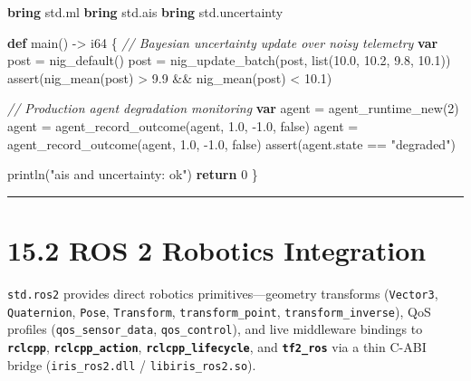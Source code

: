 \documentclass[
  english,
  oneside]{book}
\newenvironment{Shaded}{\begin{snugshade}}{\end{snugshade}}
\newcommand{\CommentTok}[1]{\textcolor[rgb]{0.42,0.60,0.33}{\textit{#1}}}
\newcommand{\ConstantTok}[1]{\textcolor[rgb]{0.31,0.76,1.00}{#1}}
\newcommand{\ControlFlowTok}[1]{\textcolor[rgb]{0.77,0.53,0.75}{\textbf{#1}}}
\newcommand{\DataTypeTok}[1]{\textcolor[rgb]{0.31,0.79,0.69}{#1}}
\newcommand{\DecValTok}[1]{\textcolor[rgb]{0.71,0.81,0.66}{#1}}
\newcommand{\FloatTok}[1]{\textcolor[rgb]{0.71,0.81,0.66}{#1}}
\newcommand{\FunctionTok}[1]{\textcolor[rgb]{0.86,0.86,0.67}{#1}}
\newcommand{\KeywordTok}[1]{\textcolor[rgb]{0.34,0.61,0.84}{\textbf{#1}}}
\newcommand{\NormalTok}[1]{\textcolor[rgb]{0.83,0.83,0.83}{#1}}
\newcommand{\OperatorTok}[1]{\textcolor[rgb]{0.83,0.83,0.83}{#1}}
\newcommand{\StringTok}[1]{\textcolor[rgb]{0.81,0.57,0.47}{#1}}
\begin{document}
\begin{Shaded}
\begin{Highlighting}[]
\KeywordTok{bring}\NormalTok{ std}\OperatorTok{.}\NormalTok{ml}
\KeywordTok{bring}\NormalTok{ std}\OperatorTok{.}\NormalTok{ais}
\KeywordTok{bring}\NormalTok{ std}\OperatorTok{.}\NormalTok{uncertainty}

\KeywordTok{def}\NormalTok{ main() }\OperatorTok{{-}\textgreater{}} \DataTypeTok{i64}\NormalTok{ \{}
    \CommentTok{// Bayesian uncertainty update over noisy telemetry}
    \KeywordTok{var}\NormalTok{ post }\OperatorTok{=}\NormalTok{ nig\_default()}
\NormalTok{    post }\OperatorTok{=}\NormalTok{ nig\_update\_batch(post, }\DataTypeTok{list}\NormalTok{(}\FloatTok{10.0}\NormalTok{, }\FloatTok{10.2}\NormalTok{, }\FloatTok{9.8}\NormalTok{, }\FloatTok{10.1}\NormalTok{))}
    \FunctionTok{assert}\NormalTok{(nig\_mean(post) }\OperatorTok{\textgreater{}} \FloatTok{9.9} \OperatorTok{\&\&}\NormalTok{ nig\_mean(post) }\OperatorTok{\textless{}} \FloatTok{10.1}\NormalTok{)}

    \CommentTok{// Production agent degradation monitoring}
    \KeywordTok{var}\NormalTok{ agent }\OperatorTok{=}\NormalTok{ agent\_runtime\_new(}\DecValTok{2}\NormalTok{)}
\NormalTok{    agent }\OperatorTok{=}\NormalTok{ agent\_record\_outcome(agent, }\FloatTok{1.0}\NormalTok{, }\OperatorTok{{-}}\FloatTok{1.0}\NormalTok{, }\ConstantTok{false}\NormalTok{)}
\NormalTok{    agent }\OperatorTok{=}\NormalTok{ agent\_record\_outcome(agent, }\FloatTok{1.0}\NormalTok{, }\OperatorTok{{-}}\FloatTok{1.0}\NormalTok{, }\ConstantTok{false}\NormalTok{)}
    \FunctionTok{assert}\NormalTok{(agent}\OperatorTok{.}\NormalTok{state }\OperatorTok{==} \StringTok{"degraded"}\NormalTok{)}

\NormalTok{    println(}\StringTok{"ais and uncertainty: ok"}\NormalTok{)}
    \ControlFlowTok{return} \DecValTok{0}
\NormalTok{\}}
\end{Highlighting}
\end{Shaded}

\begin{center}\rule{0.5\linewidth}{0.5pt}\end{center}

\section{15.2 ROS 2 Robotics
Integration}\label{ros-2-robotics-integration}

\texttt{std.ros2} provides direct robotics primitives---geometry
transforms (\texttt{Vector3}, \texttt{Quaternion}, \texttt{Pose},
\texttt{Transform}, \texttt{transform\_point},
\texttt{transform\_inverse}), QoS profiles (\texttt{qos\_sensor\_data},
\texttt{qos\_control}), and live middleware bindings to
\textbf{\texttt{rclcpp}}, \textbf{\texttt{rclcpp\_action}},
\textbf{\texttt{rclcpp\_lifecycle}}, and \textbf{\texttt{tf2\_ros}} via
a thin C-ABI bridge (\texttt{iris\_ros2.dll} /
\texttt{libiris\_ros2.so}).
\end{document}

